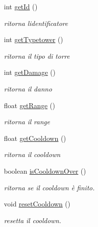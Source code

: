 \begin{DoxyCompactItemize}
int \hyperlink{classtowers_1_1_tower_a67283be3f45257d1e0c474c563ebb6b6}{get\+Id} ()
\begin{DoxyCompactList}\small\item\em ritorna l\textquotesingle{}identificatore \end{DoxyCompactList}\item 
int \hyperlink{classtowers_1_1_tower_adaa3345598ef202753372f185625e5da}{get\+Typetower} ()
\begin{DoxyCompactList}\small\item\em ritorna il tipo di torre \end{DoxyCompactList}\item 
int \hyperlink{classtowers_1_1_tower_ac10b854131d21646691dcdd7da559a22}{get\+Damage} ()
\begin{DoxyCompactList}\small\item\em ritorna il danno \end{DoxyCompactList}\item 
float \hyperlink{classtowers_1_1_tower_a18d1640fde65c20187e68286b6bbcf6d}{get\+Range} ()
\begin{DoxyCompactList}\small\item\em ritorna il range \end{DoxyCompactList}\item 
float \hyperlink{classtowers_1_1_tower_a38fbb6ebbb9c41c0c8d2d62910ac102a}{get\+Cooldown} ()
\begin{DoxyCompactList}\small\item\em ritorna il cooldown \end{DoxyCompactList}\item 
boolean \hyperlink{classtowers_1_1_tower_a2c29881b5a93fb867aea578992af0db1}{is\+Cooldown\+Over} ()
\begin{DoxyCompactList}\small\item\em ritorna se il cooldown è finito. \end{DoxyCompactList}\item 
void \hyperlink{classtowers_1_1_tower_ac49a5c9f0a8fcb8b68449da989b93542}{reset\+Cooldown} ()
\begin{DoxyCompactList}\small\item\em resetta il cooldown. \end{DoxyCompactList}\end{DoxyCompactItemize}
